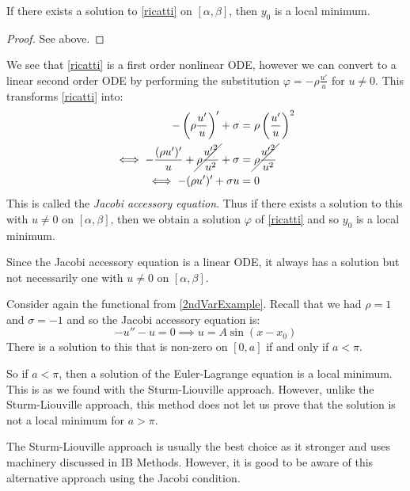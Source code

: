 \documentclass[../main.tex]{subfiles}
\begin{document}
\begin{theorem}
  If there exists a solution to \cref{ricatti} on $[\alpha, \beta]$, then $y_0$ is a local minimum.
\end{theorem}
\begin{proof}
  See above.
\end{proof}
We see that \cref{ricatti} is a first order nonlinear ODE, however we can convert to a linear second order ODE by performing the substitution $\varphi = - \rho \frac{u'}{u}$ for $u \neq 0$.
This transforms \cref{ricatti} into:
\begin{align*}
  -\left(\rho \frac{u'}{u}\right)' + \sigma &= \rho \left(\frac{u'}{u}\right)^2 \\
   \iff - \frac{(\rho u')'}{u} + \cancel{\rho \frac{{u'}^2}{u^2}} + \sigma &= \cancel{\rho \frac{{u'}^2}{u^2}} \\
   \iff -(\rho u')' + \sigma u &= 0
\end{align*}
This is called the \textit{Jacobi accessory equation}.
Thus if there exists a solution to this with $u \neq 0$ on $[\alpha, \beta]$, then we obtain a solution $\varphi$ of \cref{ricatti} and so $y_0$ is a local minimum.
\begin{remark}
  Since the Jacobi accessory equation is a linear ODE, it always has a solution but not necessarily one with $u \neq 0$ on $[\alpha, \beta]$.
\end{remark}
\begin{example}
  Consider again the functional from \cref{2ndVarExample}.
  Recall that we had $\rho = 1$ and $\sigma = -1$ and so the Jacobi accessory equation is:
  \[
    -u'' - u = 0 \implies u = A \sin (x - x_0)
  \]
  There is a solution to this that is non-zero on $[0, a]$ if and only if $a < \pi$.

  So if $a < \pi$, then a solution of the Euler-Lagrange equation is a local minimum.
  This is as we found with the Sturm-Liouville approach.
  However, unlike the Sturm-Liouville approach, this method does not let us prove that the solution is not a local minimum for $a > \pi$.
\end{example}
\begin{remark}[Advice]
  The Sturm-Liouville approach is usually the best choice as it stronger and uses machinery discussed in IB Methods.
  However, it is good to be aware of this alternative approach using the Jacobi condition.
\end{remark}
\end{document}
